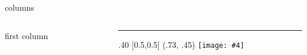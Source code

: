\documentclass[aspectratio=43]{beamer}
\makeatletter
\newcommand{\absimage}[4][0.5,0.5]{%
	\begin{textblock}{#3}%
		[#1]%
		(#2)%
		\texttt{[image: \#4]}%
\end{textblock}}
\newcommand{\mininomen}[2][1]{{\let\thefootnote\relax%
	\footnotetext{\begin{tabular}{*{#1}{@{\!}>{\centering\arraybackslash}p{1em}@{\;}p{\textwidth/#1-2em}}}%
	#2\end{tabular}}}}
\makeatother
\begin{document}
	
	
	
	

\begin{frame}{columns}
  \begin{columns}[onlytextwidth]
    \begin{column}{.5\textwidth}
      first column
    \end{column}
    \begin{column}{.5\textwidth}
      \textcolor{tudCyan}{\rule{1\columnwidth}{1\columnwidth}}
      \absimage{.73, .45}{.40}{imgs/logo-ugr.pdf}
    \end{column}
  \end{columns}
\end{frame}
\end{document}
